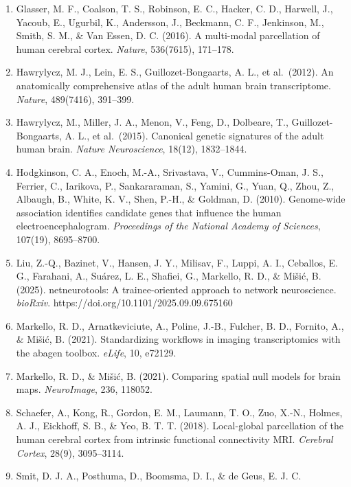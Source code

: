 \documentclass[
  11pt,
  letterpaper,
]{article}
\begin{document}
\begin{enumerate}
  Polimeni, J. R., Van Essen, D. C., \& Jenkinson, M. (2013). The
  minimal preprocessing pipelines for the Human Connectome Project.
  \emph{NeuroImage}, 80, 105--124.
\item
  Glasser, M. F., Coalson, T. S., Robinson, E. C., Hacker, C. D.,
  Harwell, J., Yacoub, E., Ugurbil, K., Andersson, J., Beckmann, C. F.,
  Jenkinson, M., Smith, S. M., \& Van Essen, D. C. (2016). A multi-modal
  parcellation of human cerebral cortex. \emph{Nature}, 536(7615),
  171--178.
\item
  Hawrylycz, M. J., Lein, E. S., Guillozet-Bongaarts, A. L., et
  al.~(2012). An anatomically comprehensive atlas of the adult human
  brain transcriptome. \emph{Nature}, 489(7416), 391--399.
\item
  Hawrylycz, M., Miller, J. A., Menon, V., Feng, D., Dolbeare, T.,
  Guillozet-Bongaarts, A. L., et al.~(2015). Canonical genetic
  signatures of the adult human brain. \emph{Nature Neuroscience},
  18(12), 1832--1844.
\item
  Hodgkinson, C. A., Enoch, M.-A., Srivastava, V., Cummins-Oman, J. S.,
  Ferrier, C., Iarikova, P., Sankararaman, S., Yamini, G., Yuan, Q.,
  Zhou, Z., Albaugh, B., White, K. V., Shen, P.-H., \& Goldman, D.
  (2010). Genome-wide association identifies candidate genes that
  influence the human electroencephalogram. \emph{Proceedings of the
  National Academy of Sciences}, 107(19), 8695--8700.
\item
  Liu, Z.-Q., Bazinet, V., Hansen, J. Y., Milisav, F., Luppi, A. I.,
  Ceballos, E. G., Farahani, A., Suárez, L. E., Shafiei, G., Markello,
  R. D., \& Mišić, B. (2025). netneurotools: A trainee-oriented approach
  to network neuroscience. \emph{bioRxiv}.
  https://doi.org/10.1101/2025.09.09.675160
\item
  Markello, R. D., Arnatkeviciute, A., Poline, J.-B., Fulcher, B. D.,
  Fornito, A., \& Mišić, B. (2021). Standardizing workflows in imaging
  transcriptomics with the abagen toolbox. \emph{eLife}, 10, e72129.
\item
  Markello, R. D., \& Mišić, B. (2021). Comparing spatial null models
  for brain maps. \emph{NeuroImage}, 236, 118052.
\item
  Schaefer, A., Kong, R., Gordon, E. M., Laumann, T. O., Zuo, X.-N.,
  Holmes, A. J., Eickhoff, S. B., \& Yeo, B. T. T. (2018). Local-global
  parcellation of the human cerebral cortex from intrinsic functional
  connectivity MRI. \emph{Cerebral Cortex}, 28(9), 3095--3114.
\item
  Smit, D. J. A., Posthuma, D., Boomsma, D. I., \& de Geus, E. J. C.

\end{enumerate}
\end{document}
